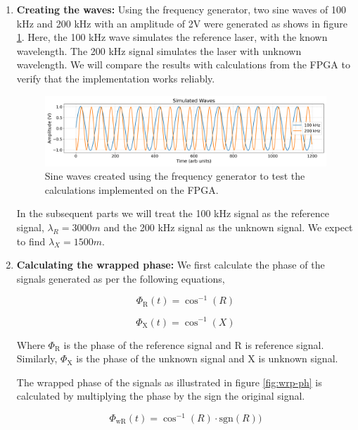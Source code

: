 \documentclass[12pt, twoside]{report}
\begin{document}
\begin{enumerate}
\item \textbf{Creating the waves:} Using the frequency generator, two sine waves of 100 kHz and 200 kHz with an amplitude of 2V were generated as shows in figure \ref{fig:waves-in}. Here, the 100 kHz wave simulates the reference laser, with the known wavelength. The 200 kHz signal simulates the laser with unknown wavelength. We will compare the results with calculations from the FPGA to verify that the implementation works reliably. 

\begin{figure}[H]
    \centering
    \includegraphics[width=\textwidth]{figs/waves-in.png}
    \caption{Sine waves created using the frequency generator to test the calculations implemented on the FPGA.}
    \label{fig:waves-in}
\end{figure}

In the subsequent parts we will treat the 100 kHz signal as the reference signal, $\lambda_R = 3000 m$ and the 200 kHz signal as the unknown signal. We expect to find $\lambda_X = 1500 m$.

\item \textbf{Calculating the wrapped phase:} 
We first calculate the phase of the signals generated as per the following equations,

\begin{equation}
\Phi_{\text{R}}(t) = \cos^{-1}(R)
\end{equation}

\begin{equation}
\Phi_{\text{X}}(t) = \cos^{-1}(X)
\end{equation}

Where $\Phi_{\text{R}}$ is the phase of the reference signal and $\text{R}$ is reference signal. Similarly, $\Phi_{\text{X}}$ is the phase of the unknown signal and $\text{X}$ is unknown signal. 

The wrapped phase of the signals as illustrated in figure \ref{fig:wrp-ph} is calculated by multiplying the phase by the sign the original signal. 

\begin{equation}
\Phi_{\text{wR}}(t) = \cos^{-1}(R) \cdot \text{sgn}(R))
\end{equation}


\end{enumerate}
\end{document}
